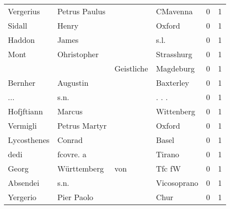 \begin{tabular}{llllrr}
                Vergerius &                      Petrus Paulus &             &                                    CMavenna &          0 &         1 \\
                   Sidall &                              Henry &             &                                      Oxford &          0 &         1 \\
                   Haddon &                              James &             &                                        s.l. &          0 &         1 \\
                     Mont &                        Ohristopher &             &                                  Strasshurg &          0 &         1 \\
                          &                                    &  Geistliche &                                   Magdeburg &          0 &         1 \\
                  Bernher &                           Augustin &             &                                   Baxterley &          0 &         1 \\
                      ... &                               s.n. &             &                                      . . .  &          0 &         1 \\
               Hofjftiann &                             Marcus &             &                                  Wittenberg &          0 &         1 \\
                 Vermigli &                      Petrus Martyr &             &                                      Oxford &          0 &         1 \\
              Lycosthenes &                             Conrad &             &                                       Basel &          0 &         1 \\
                     dedi &                          fcovre. a &             &                                      Tirano &          0 &         1 \\
                    Georg &                        Württemberg &         von &                                      Tfc fW &          0 &         1 \\
                 Absendei &                               s.n. &             &                                 Vicosoprano &          0 &         1 \\
                 Yergerio &                         Pier Paolo &             &                                        Chur &          0 &         1 \\

\end{tabular}
